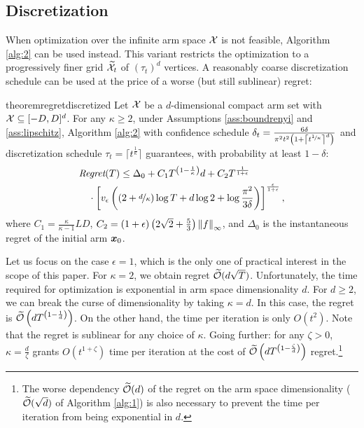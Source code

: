 \documentclass{article}
\begin{document}
\subsection{Discretization}
When optimization over the infinite arm space $\Xspace$ is not feasible, Algorithm \ref{alg:2} can be used instead. This variant restricts the optimization to a progressively finer grid $\wt{\Xspace}_t$ of $(\tau_t)^d$ vertices. A reasonably coarse discretization schedule can be used at the price of a worse (but still sublinear) regret:
%
\begin{restatable}{theorem}{regretdiscretized}\label{th:regretdiscretized}
	Let $\Xspace$ be a $d$-dimensional compact arm set with $\Xspace \subseteq [-D,D]^d$. For any $\kappa\geq2$, under Assumptions \ref{ass:boundrenyi} and \ref{ass:lipschitz}, Algorithm \ref{alg:2} with confidence schedule ${\delta_t = \frac{6\delta}{\pi^2t^2\left(1+\left\lceil t^{\nicefrac{1}{\kappa}}\right\rceil^d\right)}}$ and discretization schedule $\tau_t=\lceil t^{\frac{1}{\kappa}} \rceil$ guarantees, with probability at least $1-\delta$:
	\begin{align*}
	&\Reg(T) \leq \Delta_0  + C_1T^{\left(1-\frac{1}{\kappa}\right)}d
	+ C_2
	T^{\frac{1}{1+\epsilon}} %
	\\&\quad\cdot\left[v_{\epsilon}
	\left(\left(2+ \nicefrac{d}{\kappa}\right)\log T + d\log 2 + \log\frac{\pi^2}{3\delta}\right)\right]^{\frac{\epsilon}{1+\epsilon}},
	\end{align*}
	where $C_1=\frac{\kappa}{\kappa-1}LD$, $C_2=(1+\epsilon)\left(2\sqrt{2}+\frac{5}{3}\right)\norm[\infty]{f}$, and $\Delta_0$ is the instantaneous regret of the initial arm $\vx_0$.
\end{restatable}
%
Let us focus on the case $\epsilon=1$, which is the only one of practical interest in the scope of this paper.
For $\kappa=2$, we obtain regret $\wt{\mathcal{O}}(d\sqrt{T})$. Unfortunately, the time required for optimization is exponential in arm space dimensionality $d$. For $d\geq 2$, we can break the curse of dimensionality by taking $\kappa=d$. In this case, the regret is $\wt{\mathcal{O}}\left(dT^{\left(1-\frac{1}{d}\right)}\right)$. On the other hand, the time per iteration is only $O(t^2)$. Note that the regret is sublinear for any choice of $\kappa$. 
Going further: for any $\zeta>0$, $\kappa=\frac{d}{\zeta}$ grants $O(t^{1+\zeta})$ time per iteration at the cost of $\wt{\mathcal{O}}\left(dT^{\left(1-\frac{\zeta}{d}\right)}\right)$ regret.\footnote{The worse dependency $\wt{\mathcal{O}}(d)$ of the regret on the arm space dimensionality (\wrt $\wt{\mathcal{O}}(\sqrt{d})$ of Algorithm \ref{alg:1}) is also necessary to prevent the time per iteration from being exponential in $d$.}
\end{document}
